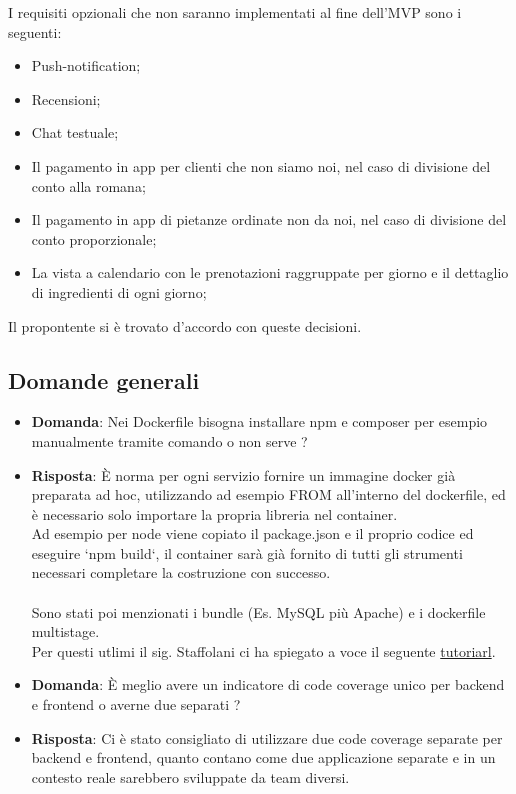 \documentclass[a4paper, 11pt]{article}
\begin{document}
I requisiti opzionali che non saranno implementati al fine dell'MVP sono i seguenti:

\begin{itemize}
\item Push-notification;
\item Recensioni;
\item Chat testuale;
\item Il pagamento in app per clienti che non siamo noi, nel caso di divisione del conto alla romana;
\item Il pagamento in app di pietanze ordinate non da noi, nel caso di divisione del conto proporzionale;
\item La vista a calendario con le prenotazioni raggruppate per giorno e il dettaglio di ingredienti di ogni giorno;
\end{itemize}

Il propontente si è trovato d'accordo con queste decisioni.

\subsection{Domande generali}

\begin{itemize}
\item \textbf{Domanda}: Nei Dockerfile bisogna installare npm e composer per esempio manualmente tramite comando o non serve ?%
\item \textbf{Risposta}: È norma per ogni servizio fornire un immagine docker già preparata ad hoc, utilizzando ad esempio FROM all'interno del dockerfile, ed è necessario solo importare la propria libreria nel container. \\ Ad esempio per node viene copiato il package.json e il proprio codice ed eseguire `npm build`, il container sarà già fornito di tutti gli strumenti necessari completare la costruzione con successo. \\ \\ Sono stati poi menzionati i bundle (Es. MySQL più Apache) e i dockerfile multistage. \\ Per questi utlimi il sig. Staffolani ci ha spiegato a voce il seguente \href{https://medium.com/@mohamedbenkhemiswork576/how-to-dockerize-a-react-app-with-multi-stage-build-and-nginx-minimize-react-image-size-by-80-33a09ae20118}{tutoriarl}.
\end{itemize}

\begin{itemize}
\item \textbf{Domanda}: È meglio avere un indicatore di code coverage unico per backend e frontend o averne due separati ?%
\item \textbf{Risposta}: Ci è stato consigliato di utilizzare due code coverage separate per backend e frontend, quanto contano come due applicazione separate e in un contesto reale sarebbero sviluppate da team diversi.
\end{itemize}
\end{document}
